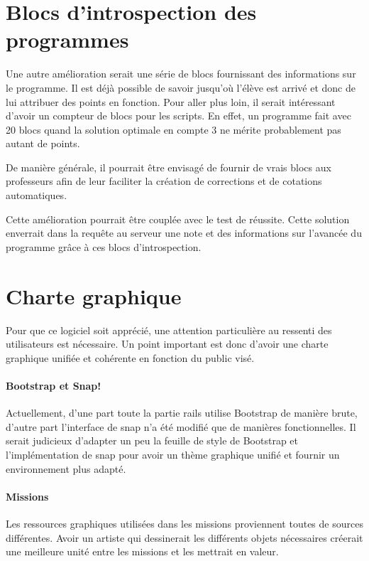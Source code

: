 \section{Blocs d'introspection des programmes}
Une autre amélioration serait une série de \glspl{bloc}  fournissant des informations sur le programme. Il est déjà possible de savoir jusqu'où l'élève est arrivé et donc de lui attribuer des points en fonction.
Pour aller plus loin, il serait intéressant d'avoir un compteur de \glspl{bloc}  pour les \glspl{script}. En effet, un programme fait avec 20 \glspl{bloc}  quand la solution optimale en compte 3 ne mérite probablement pas autant de points.

De manière générale, il pourrait être envisagé de fournir de vrais \glspl{bloc}  aux professeurs afin de leur faciliter la création de corrections et de cotations automatiques.

Cette amélioration pourrait être couplée avec le test de réussite. Cette solution enverrait dans la requête au serveur une note et des informations sur l'avancée du programme grâce à ces \glspl{bloc}  d'introspection.

\section{Charte graphique}
Pour que ce logiciel soit apprécié, une attention particulière au ressenti des utilisateurs est nécessaire. Un point important est donc d'avoir une charte graphique unifiée et cohérente en fonction du public visé.

\paragraph{Bootstrap et Snap!}
Actuellement, d'une part toute la partie \gls{rails} utilise Bootstrap de manière brute, d'autre part l'interface de \gls{snap} n'a été modifié que de manières fonctionnelles. Il serait judicieux d'adapter un peu la feuille de style de Bootstrap et l'implémentation de \gls{snap} pour avoir un thème graphique unifié et fournir un environnement plus adapté.

\paragraph{Missions}
Les ressources graphiques utilisées dans les \glspl{mission} proviennent toutes de sources différentes. Avoir un artiste qui dessinerait les différents objets nécessaires créerait une meilleure unité entre les \glspl{mission} et les mettrait en valeur.

